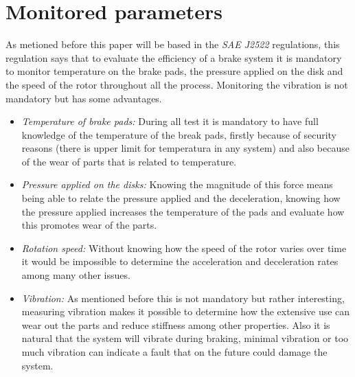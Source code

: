 \section{Monitored parameters}
		As metioned before this paper will be based in the \textit{SAE J2522} regulations, this regulation says that to evaluate the efficiency of a brake system it is mandatory to monitor temperature on the brake pads, the pressure applied on the disk and the speed of the rotor throughout all the process. Monitoring the vibration is not mandatory but has some advantages.

	\begin{itemize}
		\item\textit{Temperature of brake pads: } During all test it is mandatory to have full knowledge of the temperature of the break pads, firstly because of security reasons (there is upper limit for temperatura in any system) and also because of the wear of parts that is related to temperature.
		\item\textit{Pressure applied on the disks: } Knowing the magnitude of this force means being able to relate the pressure applied and the deceleration, knowing how the pressure applied increases the temperature of the pads and evaluate how this promotes wear of the parts.
		\item\textit{Rotation speed: } Without knowing how the speed of the rotor varies over time it would be impossible to determine the acceleration and deceleration rates among many other issues.
		\item\textit{Vibration: } As mentioned before this is not mandatory but rather interesting, measuring vibration makes it possible to determine how the extensive use can wear out the parts and reduce stiffness among other properties. Also it is natural that the system will vibrate during braking, minimal vibration or too much vibration can indicate a fault that on the future could damage the system.
	\end{itemize}

